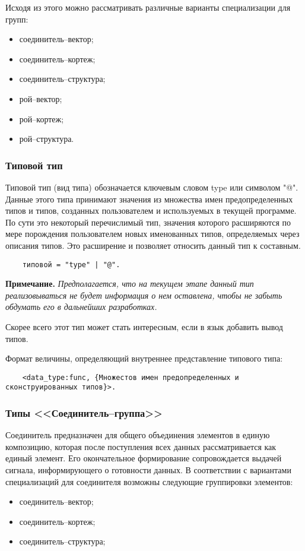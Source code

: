 {Исходя из этого можно рассматривать различные варианты специализации для групп:
\begin{itemize}
    \item соединитель--вектор;
    \item соединитель--кортеж;
    \item соединитель--структура;
    \item рой--вектор;
    \item рой--кортеж;
    \item рой--структура.
\end{itemize}

\subsubsection{Типовой тип}

Типовой тип (вид типа) обозначается ключевым словом type или символом "@". Данные этого типа принимают значения из множества имен предопределенных типов и типов, созданных пользователем и используемых в текущей программе. По сути это некоторый перечислимый тип, значения которого расширяются по мере порождения пользователем новых именованных типов, определяемых через описания типов. Это расширение и позволяет относить данный тип к составным.

\begin{verbatim}
	типовой = "type" | "@".
\end{verbatim}

\textbf{Примечание.}
\textit{Предполагается, что на текущем этапе данный тип реализовываться не будет информация о нем оставлена, чтобы не забыть обдумать его в дальнейших разработках.}

Скорее всего этот тип может стать интересным, если в язык добавить вывод типов.

Формат величины, определяющий внутреннее представление типового типа:

\begin{verbatim}
	<data_type:func, {Множестов имен предопределенных и сконструированных типов}>.
\end{verbatim}

\subsubsection{Типы <<Соединитель--группа>>}

Соединитель предназначен для общего объединения элементов в единую композицию, которая после поступления всех данных рассматривается как единый элемент. Его окончательное формирование сопровождается выдачей сигнала, информирующего о готовности данных. В соответствии с вариантами специализаций для соединителя возможны следующие группировки элементов:
\begin{itemize}
    \item соединитель--вектор;
    \item соединитель--кортеж;
    \item соединитель--структура;
\end{itemize}

}
